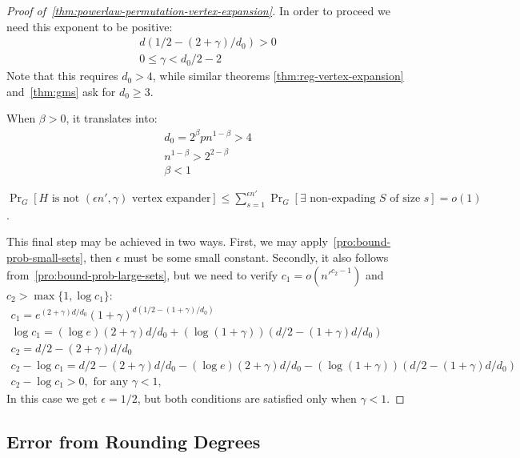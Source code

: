 \begin{proof}[Proof of~\autoref{thm:powerlaw-permutation-vertex-expansion}]
    In order to proceed we need this exponent to be positive:
    \begin{gather}
        d(1/2-(2+\gamma)/d_0)>0\\
        0\leq\gamma<d_0/2-2
    \end{gather}
    Note that this requires $d_0>4$, while similar theorems
    \ref{thm:reg-vertex-expansion} and~\ref{thm:gms} ask for $d_0\geq 3$.
    
    When $\beta>0$, it translates into:
    \begin{gather}
        d_0=2^\beta pn^{1-\beta}>4\\
        n^{1-\beta}>2^{2-\beta}\\
        \beta<1
    \end{gather}
    
    $\Pr_G[H\text{ is not }(\epsilon n',\gamma)\text{ vertex expander}]
    \leq\sum_{s=1}^{\epsilon n'}{\Pr_G[\exists\text{ non-expading }S\text{ of size }s]}=o(1)$.
    
    This final step may be achieved in two ways.
    First, we may apply~\autoref{pro:bound-prob-small-sets},
    then $\epsilon$ must be some small constant.
    Secondly, it also follows from~\autoref{pro:bound-prob-large-sets}, but we
    need to verify $c_1=o\left(n'^{c_2-1}\right)$ and $c_2>\max\{1,\log c_1\}$:
    \begin{gather*}
        c_1=e^{(2+\gamma)d/d_0}(1+\gamma)^{d(1/2-(1+\gamma)/d_0)}\\
        \log c_1=(\log e)(2+\gamma)d/d_0+(\log(1+\gamma))(d/2-(1+\gamma)d/d_0)\\
        c_2=d/2-(2+\gamma)d/d_0\\
        c_2-\log c_1=
        d/2-(2+\gamma)d/d_0
        -(\log e)(2+\gamma)d/d_0
        -(\log(1+\gamma))(d/2-(1+\gamma)d/d_0)\\
        c_2-\log c_1>0,\text{ for any }\gamma<1,
    \end{gather*}
    In this case we get $\epsilon=1/2$, but both conditions
    are satisfied only when $\gamma<1$.
\end{proof}

\subsection{Error from Rounding Degrees}
\label{subsec:powerlaw-permutation-rounding-error}

